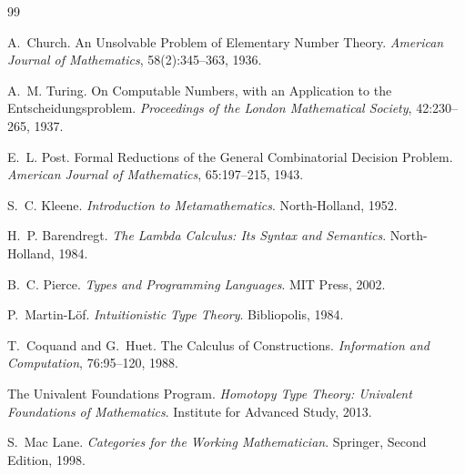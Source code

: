 \documentclass[12pt,oneside]{article}
\theoremstyle{definition}
\theoremstyle{remark}
\begin{document}
\begin{thebibliography}{99}


A.~Church.
\newblock An Unsolvable Problem of Elementary Number Theory.
\newblock \emph{American Journal of Mathematics}, 58(2):345--363, 1936.

A.~M. Turing.
\newblock On Computable Numbers, with an Application to the Entscheidungsproblem.
\newblock \emph{Proceedings of the London Mathematical Society}, 42:230--265, 1937.

E.~L. Post.
\newblock Formal Reductions of the General Combinatorial Decision Problem.
\newblock \emph{American Journal of Mathematics}, 65:197--215, 1943.

S.~C. Kleene.
\newblock \emph{Introduction to Metamathematics}.
\newblock North-Holland, 1952.


H.~P. Barendregt.
\newblock \emph{The Lambda Calculus: Its Syntax and Semantics}.
\newblock North-Holland, 1984.

B.~C. Pierce.
\newblock \emph{Types and Programming Languages}.
\newblock MIT Press, 2002.


P.~Martin-L{\"o}f.
\newblock \emph{Intuitionistic Type Theory}.
\newblock Bibliopolis, 1984.

T.~Coquand and G.~Huet.
\newblock The Calculus of Constructions.
\newblock \emph{Information and Computation}, 76:95--120, 1988.

The Univalent Foundations Program.
\newblock \emph{Homotopy Type Theory: Univalent Foundations of Mathematics}.
\newblock Institute for Advanced Study, 2013.


S.~Mac Lane.
\newblock \emph{Categories for the Working Mathematician}.
\newblock Springer, Second Edition, 1998.


\end{thebibliography}
\end{document}
